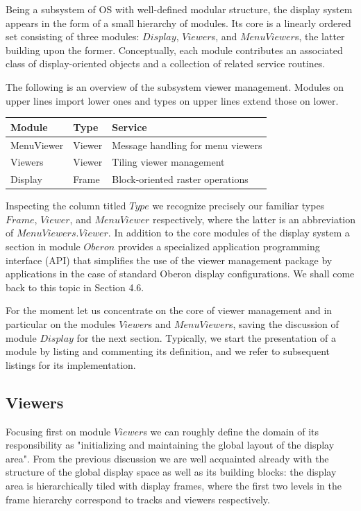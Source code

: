 Being a subsystem of OS with well-defined modular structure, the display system appears
in the form of a small hierarchy of modules. Its core is a linearly ordered set consisting of three
modules: $Display$, $Viewer$s, and $MenuViewer$s, the latter building upon the former. Conceptually,
each module contributes an associated class of display-oriented objects and a collection of related service routines.

The following is an overview of the subsystem viewer management. Modules on upper lines import lower ones and types on upper lines extend those on lower.
\begin{table}[h!]
	\setlength{\tabcolsep}{2pt}
	\begin{tabular}{l|l|l}
		Module     &Type   &Service \\\hline
		MenuViewer &Viewer &Message handling for menu viewers\\
		Viewers    &Viewer &Tiling viewer management\\
		Display    &Frame  &Block-oriented raster operations
	\end{tabular}
\end{table}
Inspecting the column titled $Type$ we recognize precisely our familiar types $Frame$, $Viewer$, and
$MenuViewer$ respectively, where the latter is an abbreviation of $MenuViewers.Viewer$.
In addition to the core modules of the display system a section in module $Oberon$ provides a
specialized application programming interface (API) that simplifies the use of the viewer
management package by applications in the case of standard Oberon display configurations. We
shall come back to this topic in Section 4.6.

For the moment let us concentrate on the core of viewer management and in particular on the
modules $Viewer$s and $MenuViewer$s, saving the discussion of module $Display$ for the next
section. Typically, we start the presentation of a module by listing and commenting its definition,
and we refer to subsequent listings for its implementation.

\subsection{Viewers}
Focusing first on module $Viewer$s we can roughly define the domain of its responsibility as
"initializing and maintaining the global layout of the display area". From the previous discussion
we are well acquainted already with the structure of the global display space as well as its
building blocks: the display area is hierarchically tiled with display frames, where the first two
levels in the frame hierarchy correspond to tracks and viewers respectively.

